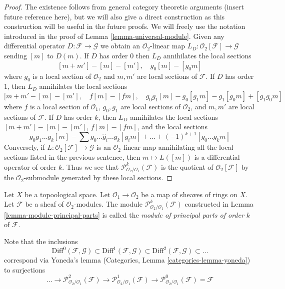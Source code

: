\begin{proof}
The existence follows from general category theoretic arguments
(insert future reference here), but we will also give a direct
construction as this construction will be useful in the future proofs.
We will freely use the notation introduced in the proof of
Lemma \ref{lemma-universal-module}.
Given any differential operator $D : \mathcal{F} \to \mathcal{G}$
we obtain an $\mathcal{O}_2$-linear map
$L_D : \mathcal{O}_2[\mathcal{F}] \to \mathcal{G}$
sending $[m]$ to $D(m)$. If $D$ has order $0$
then $L_D$ annihilates the local sections
$$
[m + m'] - [m] - [m'],\quad
g_0[m] - [g_0m]
$$
where $g_0$ is a local section of $\mathcal{O}_2$ and $m, m'$
are local sections of $\mathcal{F}$. If $D$ has order $1$, then $L_D$
annihilates the local sections
$$
[m + m' - [m] - [m'],\quad
f[m] - [fm], \quad
g_0g_1[m] - g_0[g_1m] - g_1[g_0m] + [g_1g_0m]
$$
where $f$ is a local section of $\mathcal{O}_1$,
$g_0, g_1$ are local sections of $\mathcal{O}_2$, and
$m, m'$ are local sections of $\mathcal{F}$.
If $D$ has order $k$, then $L_D$ annihilates the local sections
$[m + m'] - [m] - [m']$, $f[m] - [fm]$, and the local sections
$$
g_0g_1\ldots g_k[m] - \sum g_0 \ldots \hat g_i \ldots g_k[g_im] + \ldots
+(-1)^{k + 1}[g_0\ldots g_km]
$$
Conversely, if $L : \mathcal{O}_2[\mathcal{F}] \to \mathcal{G}$ is an
$\mathcal{O}_2$-linear map annihilating all the local sections
listed in the previous sentence, then $m \mapsto L([m])$ is a
differential operator of order $k$. Thus we see that
$\mathcal{P}^k_{\mathcal{O}_2/\mathcal{O}_1}(\mathcal{F})$
is the quotient of $\mathcal{O}_2[\mathcal{F}]$
by the $\mathcal{O}_2$-submodule generated by these local sections.
\end{proof}

\begin{definition}
\label{definition-module-principal-parts}
Let $X$ be a topoological space.
Let $\mathcal{O}_1 \to \mathcal{O}_2$ be a map of sheaves of rings on $X$.
Let $\mathcal{F}$ be a sheaf of $\mathcal{O}_2$-modules.
The module $\mathcal{P}^k_{\mathcal{O}_2/\mathcal{O}_1}(\mathcal{F})$
constructed in Lemma \ref{lemma-module-principal-parts}
is called the {\it module of principal parts of order $k$} of $\mathcal{F}$.
\end{definition}

\noindent
Note that the inclusions
$$
\text{Diff}^0(\mathcal{F}, \mathcal{G}) \subset
\text{Diff}^1(\mathcal{F}, \mathcal{G}) \subset
\text{Diff}^2(\mathcal{F}, \mathcal{G}) \subset \ldots
$$
correspond via Yoneda's lemma (Categories, Lemma \ref{categories-lemma-yoneda})
to surjections
$$
\ldots \to \mathcal{P}^2_{\mathcal{O}_2/\mathcal{O}_1}(\mathcal{F})
\to \mathcal{P}^1_{\mathcal{O}_2/\mathcal{O}_1}(\mathcal{F})
\to \mathcal{P}^0_{\mathcal{O}_2/\mathcal{O}_1}(\mathcal{F}) = \mathcal{F}
$$


